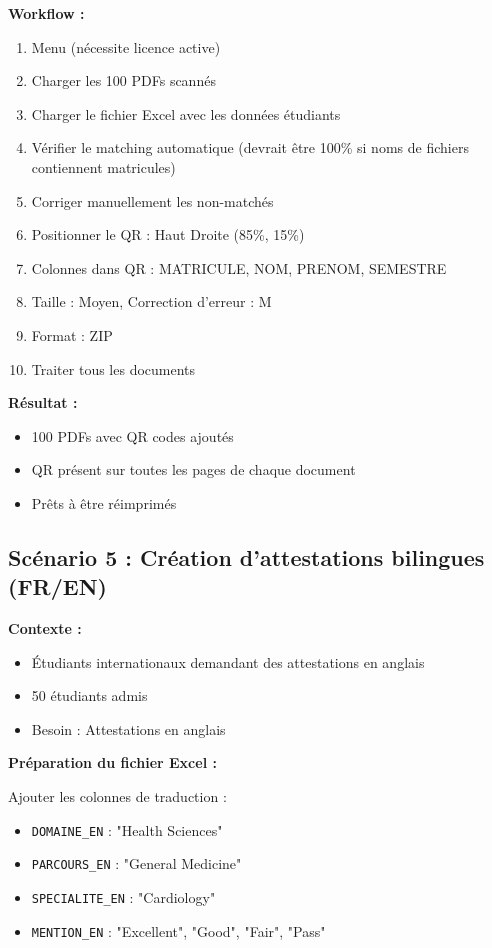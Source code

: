 \textbf{Workflow :}

\begin{enumerate}[leftmargin=*]
    \item Menu  (nécessite licence active)
    \item Charger les 100 PDFs scannés
    \item Charger le fichier Excel avec les données étudiants
    \item Vérifier le matching automatique (devrait être 100\% si noms de fichiers contiennent matricules)
    \item Corriger manuellement les non-matchés
    \item Positionner le QR : Haut Droite (85\%, 15\%)
    \item Colonnes dans QR : MATRICULE, NOM, PRENOM, SEMESTRE
    \item Taille : Moyen, Correction d'erreur : M
    \item Format : ZIP
    \item Traiter tous les documents
\end{enumerate}

\textbf{Résultat :}
\begin{itemize}[leftmargin=*]
    \item 100 PDFs avec QR codes ajoutés
    \item QR présent sur toutes les pages de chaque document
    \item Prêts à être réimprimés
\end{itemize}

\subsection{Scénario 5 : Création d'attestations bilingues (FR/EN)}

\textbf{Contexte :}
\begin{itemize}[leftmargin=*]
    \item Étudiants internationaux demandant des attestations en anglais
    \item 50 étudiants admis
    \item Besoin : Attestations en anglais
\end{itemize}

\textbf{Préparation du fichier Excel :}

Ajouter les colonnes de traduction :
\begin{itemize}[leftmargin=*]
    \item \texttt{DOMAINE\_EN} : "Health Sciences"
    \item \texttt{PARCOURS\_EN} : "General Medicine"
    \item \texttt{SPECIALITE\_EN} : "Cardiology"
    \item \texttt{MENTION\_EN} : "Excellent", "Good", "Fair", "Pass"
\end{itemize}

